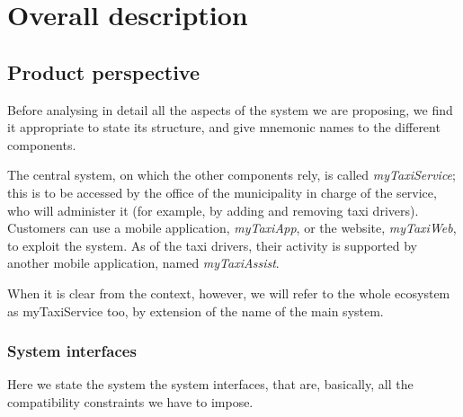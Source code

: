 \chapter{Overall description}\label{chap:overallDesc}


\section{Product perspective}\label{sec:productPerspective}
Before analysing in detail all the aspects of the system we are proposing, we find it appropriate to state its structure, and give mnemonic names to the different components. 

The central system, on which the other components rely, is called \emph{myTaxiService}; this is to be accessed by the office of the municipality in charge of the service, who will administer it (for example, by adding and removing taxi drivers). Customers can use a mobile application, \emph{myTaxiApp}, or the website, \emph{myTaxiWeb}, to exploit the system. As of the taxi drivers, their activity is supported by another mobile application, named \emph{myTaxiAssist}. 

When it is clear from the context, however, we will refer to the whole ecosystem as myTaxiService too, by extension of the name of the main system. 


\subsection{System interfaces}\label{subsec:systemInterfaces}
Here we state the system the system interfaces, that are, basically, all the compatibility constraints we have to impose.

